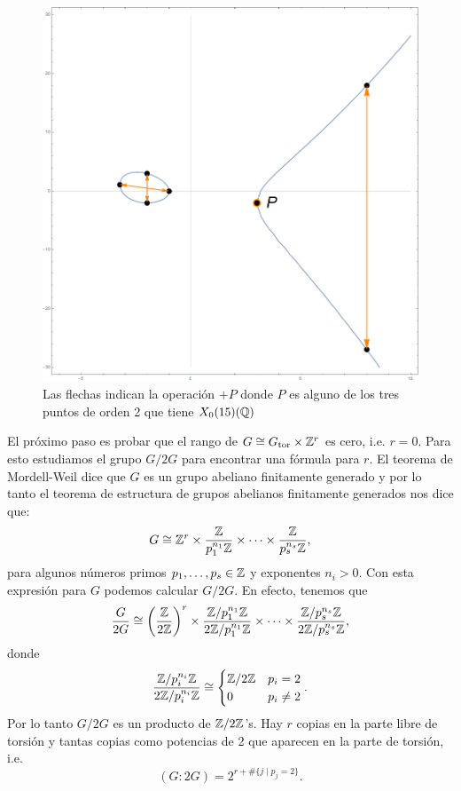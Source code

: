 \documentclass[../../tesis_maestria]{subfiles}
\begin{document}
\begin{figure}
\begin{minipage}[t]{0.3\textwidth}
\end{minipage}
\begin{minipage}[t]{0.3\textwidth}
	\includegraphics[width=\textwidth]{figuras/orbitas-puntos-3}
\end{minipage}
\caption{Las flechas indican la operación $+P$ donde $P$ es alguno de los tres puntos de orden 2 que tiene $X_0(15)(\mathbb{Q})$}
\label{fig:orbitas-puntos}
\end{figure}


El próximo paso es probar que el rango de $G\cong G_\mathrm{tor}\times\mathbb{Z}^r$ es cero, i.e. $r=0$. Para esto estudiamos el grupo $G/2G$ para encontrar una fórmula para $r$. El teorema de Mordell-Weil dice que $G$ es un grupo abeliano finitamente generado y por lo tanto el teorema de estructura de grupos abelianos finitamente generados nos dice que:
\[
	G\cong\mathbb{Z}^r\times\frac{\mathbb{Z}}{p_1^{n_1}\mathbb{Z}}\times\cdots\times\frac{\mathbb{Z}}{p_s^{n_s}\mathbb{Z}},
\]
para algunos números primos $p_1,\ldots,p_s\in\mathbb{Z}$ y exponentes $n_i>0$. Con esta expresión para $G$ podemos calcular $G/2G$. En efecto, tenemos que
\[
	\frac{G}{2G}\cong\left(\frac{\mathbb{Z}}{2\mathbb{Z}}\right)^r\times\frac{\mathbb{Z}/p_1^{n_1}\mathbb{Z}}{2\mathbb{Z}/p_1^{n_1}\mathbb{Z}}\times\cdots\times\frac{\mathbb{Z}/p_s^{n_s}\mathbb{Z}}{2\mathbb{Z}/p_s^{n_s}\mathbb{Z}},
\]
donde
\[
	\frac{\mathbb{Z}/p_i^{n_i}\mathbb{Z}}{2\mathbb{Z}/p_i^{n_i}\mathbb{Z}}\cong
	\begin{cases}
	\mathbb{Z}/2\mathbb{Z} & p_i=2\\
	0 & p_i\neq 2
	\end{cases}.
\]
Por lo tanto $G/2G$ es un producto de $\mathbb{Z}/2\mathbb{Z}$'s. Hay $r$ copias en la parte libre de torsión y tantas copias como potencias de 2 que aparecen en la parte de torsión, i.e.
\begin{equation}\label{eq:indice-G-2G-inicial}
	(G:2G)=2^{r+\#\{j\mid p_j=2\}}.
\end{equation}
\end{document}
